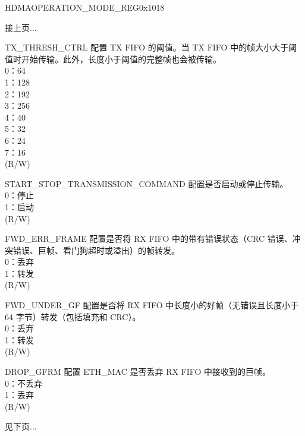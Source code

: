 \begin{register}{H}{DMAOPERATION\_MODE\_REG}{0x1018}
\begin{regdesc}\begin{reglist}
\item[接上页...]

\item [TX\_THRESH\_CTRL] 配置 TX FIFO 的阈值。当 TX FIFO 中的帧大小大于阈值时开始传输。此外，长度小于阈值的完整帧也会被传输。\\
0：64\\
1：128\\
2：192\\
3：256\\
4：40\\
5：32\\
6：24\\
7：16\\(R/W)
\item [START\_STOP\_TRANSMISSION\_COMMAND] 配置是否启动或停止传输。\\
0：停止\\
1：启动\\ (R/W)
\item [FWD\_ERR\_FRAME] 配置是否将 RX FIFO 中的带有错误状态（CRC 错误、冲突错误、巨帧、看门狗超时或溢出）的帧转发。\\
0：丢弃\\
1：转发\\
(R/W)
\item [FWD\_UNDER\_GF] 配置是否将 RX FIFO 中长度小的好帧（无错误且长度小于 64 字节）转发（包括填充和 CRC）。\\
0：丢弃\\
1：转发\\
(R/W)
\item [DROP\_GFRM] 配置 ETH\_MAC 是否丢弃 RX FIFO 中接收到的巨帧。\\
0：不丢弃\\
1：丢弃\\(R/W)

\item[见下页...]
\end{reglist}\end{regdesc}
\end{register}
\addtocounter{Regfloat}{-1}
